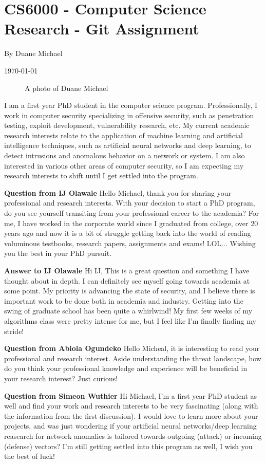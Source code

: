 
    
    \section{CS6000 - Computer Science Research - Git Assignment}
    By Duane Michael
    
    \today
 

\begin{figure}[h]
    \centering
    \caption{A photo of Duane Michael}
    \label{fig:headshot}
\end{figure}
I am a first year PhD student in the computer science program. Professionally, I work in computer security specializing in offensive security, such as penetration testing, exploit development, vulnerability research, etc. My current academic research interests relate to the application of machine learning and artificial intelligence techniques, such as artificial neural networks and deep learning, to detect intrusions and anomalous behavior on a network or system. I am also interested in various other areas of computer security, so I am expecting my research interests to shift until I get settled into the program.

\textbf{Question from IJ Olawale}
Hello Michael, thank you for sharing your professional and research interests. With your decision to start a PhD program, do you see yourself transiting from your professional career to the academia? For me, I have worked in the corporate world since I graduated from college, over 20 years ago and now it is a bit of struggle getting back into the world of reading voluminous testbooks, research papers, assignments and exams! LOL... Wishing you the best in your PhD pursuit.

\textbf{Answer to IJ Olawale}
Hi IJ, This is a great question and something I have thought about in depth. I can definitely see myself going towards academia at some point. My priority is advancing the state of security, and I believe there is important work to be done both in academia and industry. Getting into the swing of graduate school has been quite a whirlwind! My first few weeks of my algorithms class were pretty intense for me, but I feel like I'm finally finding my stride!

\textbf{Question from Abiola Ogundeko}
Hello Micheal, it is interesting to read your professional and research interest. Aside understanding the threat landscape, how do you think your professional knowledge and experience will be beneficial in your research interest? Just curious!

\textbf{Question from Simeon Wuthier}
Hi Michael, I'm a first year PhD student as well and find your work and research interests to be very fascinating (along with the information from the first discussion). I would love to learn more about your projects, and was just wondering if your artificial neural networks/deep learning reasearch for network anomalies is tailored towards outgoing (attack) or incoming (defense) vectors? I'm still getting settled into this program as well, I wish you the best of luck!